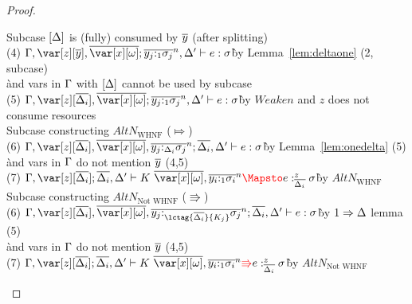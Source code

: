 \begin{proof}
\begin{description}
\begin{tabbing}
    Subcase $\left[\Delta\right]$ is (fully) consumed by $\overline{y}$ (after splitting)\\
    (4) $\G,\z[\ov{y}],\ov{\xo};\ov{y_j{:}_{1}\s_j}^n, \D' \vdash e : \s$\`by Lemma~\ref{lem:deltaone} (2, subcase)\\\` and vars in $\Gamma$ with $\left[\Delta\right]$ cannot be used by subcase\\
    (5) $\G,\z[\ov{\D_i}],\ov{\xo};\ov{y_j{:}_{1}\s_j}^n, \D' \vdash e : \s$\`by $Weaken$ and $z$ does not consume resources\\
    Subcase constructing $AltN_{\textrm{WHNF}}$ ($\Mapsto$)\\
    (6) $\G,\z[\ov{\D_i}],\ov{\xo},\ov{y_j{:}_{\D_i}\s_j}^n; \ov{\D_i}, \D' \vdash e : \s$\`by Lemma~\ref{lem:onedelta} (5)\\\`and vars in $\Gamma$ do not mention $\overline{y}$ (4,5)\\
    (7) $\G,\z[\ov{\D_i}]; \ov{\D_i}, \D' \vdash K~\ov{\xo},\ov{y_i{:}_{1}\s_i}^n\ROUNDTWO{\Mapsto}e :^z_{\ov{\D_i}} \s$\`by $AltN_{\textrm{WHNF}}$\\
    Subcase constructing $AltN_{\textrm{Not WHNF}}$ ($\Rrightarrow$)\\
    (6) $\G,\z[\ov{\D_i}],\ov{\xo},\ov{y_j{:}_{\lctag{\ov{\D_i}}{K_j}}\s_j}^n; \ov{\D_i}, \D' \vdash e : \s$\`by $1 \Rightarrow \Delta$ lemma (5)\\\`and vars in $\Gamma$ do not mention $\overline{y}$ (4,5)\\
    (7) $\G,\z[\ov{\D_i}]; \ov{\D_i}, \D' \vdash K~\ov{\xo},\ov{y_i{:}_{1}\s_i}^n\ROUNDTWO{\Rrightarrow} e :^z_{\ov{\D_i}} \s $\`by $AltN_{\textrm{Not WHNF}}$\\
\end{tabbing}

\end{description}
\end{proof}

